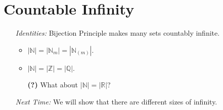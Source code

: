\documentclass[a4paper, 11pt]{article} %
\newcommand{\abs}[1]{|#1|} %
\newcommand{\N}{\mathbb{N}}
\newcommand{\Z}{\mathbb{Z}}
\newcommand{\Q}{\mathbb{Q}}
\newcommand{\R}{\mathbb{R}}
\begin{document}
\section*{Countable Infinity}

\begin{enumerate}
  \item[\it Identities:] Bijection Principle makes many sets countably infinite.
    \begin{itemize}[leftmargin=-.2in]
      \item $\abs{\N} = \abs{\N_m} = \abs{\N_{(m)}}$.  
      \item $\abs{\N} = \abs{\Z} = \abs{\Q}$.
      \item[\bf (?)] What about $\abs{\N} = \abs{\R}$?
    \end{itemize}
  \item[\it Next Time:] We will show that there are different sizes of infinity.
\end{enumerate}
\end{document}
